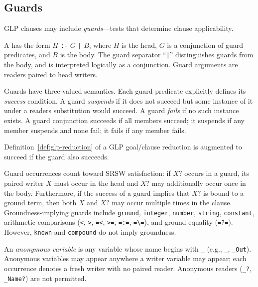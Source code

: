 \subsection{Guards}
\label{sec:guards}

GLP clauses may include \emph{guards}---tests that determine clause applicability.

\begin{definition}
\label{def:guarded-clause}
A  has the form $H$ \verb|:-| $G$ \verb"|" $B$, where $H$ is the head, $G$ is a conjunction of guard predicates, and $B$ is the body. The guard separator ``\verb"|"'' distinguishes guards from the body, and is interpreted logically as a conjunction.  Guard arguments are readers paired to head writers.
\end{definition}

Guards have three-valued semantics. Each guard predicate explicitly defines its \emph{success} condition. A guard \emph{suspends} if it does not succeed but some instance of it under a readers substitution would succeed. A guard \emph{fails} if no such instance exists. A guard conjunction succeeds if all members succeed; it suspends if any member suspends and none fail; it fails if any member fails.

Definition~\ref{def:glp-reduction} of a GLP goal/clause reduction is augmented to succeed if the guard also succeeds.

\begin{remark}
\label{rem:guards-srsw}
Guard occurrences count toward SRSW satisfaction: if $X?$ occurs in a guard, its paired writer $X$ must occur in the head and $X?$ may additionally occur once in the body.
%
Furthermore, if the success of a guard implies that $X?$ is bound to a ground term, then both $X$ and $X?$ may occur multiple times in the clause. Groundness-implying guards include \verb|ground|, \verb|integer|, \verb|number|, \verb|string|, \verb|constant|, arithmetic comparisons (\verb|<|, \verb|>|, \verb|=<|, \verb|>=|, \verb|=:=|, \verb|=\=|), and ground equality (\verb|=?=|). However,  \verb|known| and \verb|compound| do not imply groundness.
\end{remark}

\begin{remark}
\label{rem:anonymous-variables}
An \emph{anonymous variable} is any variable whose name begins with \verb|_| (e.g., \verb|_|, \verb|_Out|). Anonymous variables may appear anywhere a writer variable may appear; each occurrence denotes a fresh writer with no paired reader. Anonymous readers (\verb|_?|, \verb|_Name?|) are not permitted.
\end{remark}

